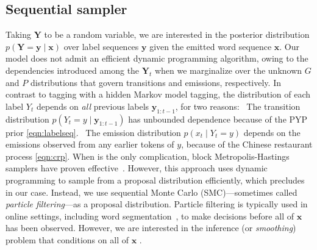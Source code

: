 \documentclass[11pt]{article}
\newcommand{\circone}{\ding{172}\xspace}
\newcommand{\circtwo}{\ding{173}\xspace}
\begin{document}
\subsection{Sequential sampler}\label{sec:inf1}

Taking $\bm{Y}$ to be a random variable, we are interested in the posterior distribution $p(\bm{Y}=\bm{y} \mid \bm{x})$
over label sequences $\bm{y}$ given the emitted word sequence $\bm{x}$.
Our model does not
admit an efficient dynamic programming algorithm,
owing to the dependencies introduced among the $\bm{Y}_t$ when we marginalize over the unknown $G$ and $P$ distributions that govern transitions and emissions, respectively.
In contrast to tagging with a hidden Markov model tagging, the distribution of each label $Y_t$ depends on {\em all} previous labels $\bm{y}_{1:t-1}$, for two reasons: \circone~The transition distribution $p(Y_t=y \mid \bm{y}_{1:t-1})$ has unbounded dependence because of the PYP prior \eqref{eqn:labelseq}.  \circtwo~The emission distribution $p(x_t \mid Y_t=y)$ depends on the emissions observed from any earlier tokens of $y$, because of the Chinese restaurant process \eqref{eqn:crp}.
When \circtwo is the only
complication, block Metropolis-Hastings samplers have proven
effective~\cite{johnson2007bayesian}. However, this approach uses
dynamic programming to sample from a proposal distribution efficiently, which \circone precludes in our case. Instead, we use sequential Monte Carlo (SMC)---sometimes called \emph{particle filtering}---as a proposal distribution. Particle filtering is typically used in online settings, including word segmentation~\cite{borsch2011}, to make decisions before all of $\bm{x}$ has been observed. However, we are interested in the inference (or \emph{smoothing}) problem that conditions on all of $\bm{x}$ \cite{Dubbin:2012:UBP:2405473.2405539,Tripuraneni:2015:PGI:2969442.2969507}.
\end{document}
